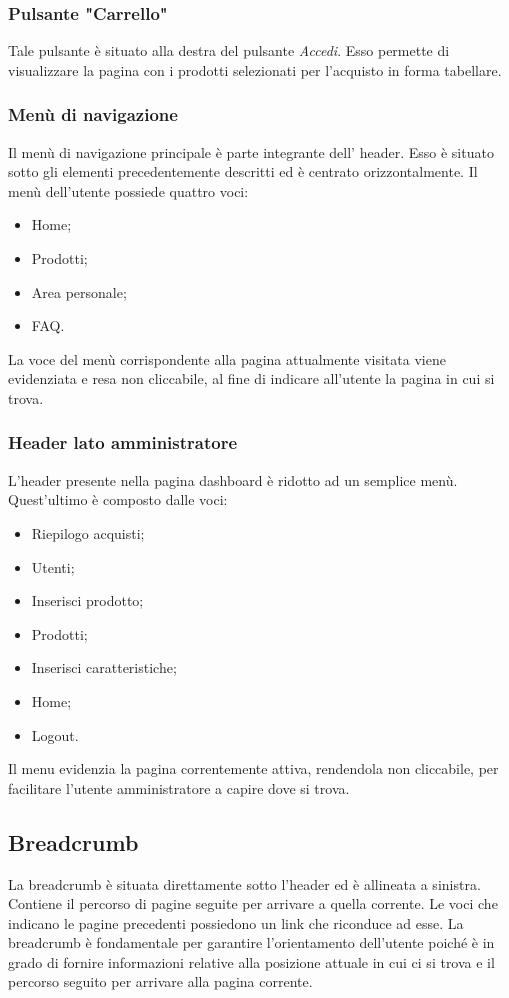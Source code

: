 \subsubsection{Pulsante "Carrello"}
Tale pulsante è situato alla destra del pulsante \textit{Accedi}. Esso permette di visualizzare la pagina con i prodotti selezionati per l'acquisto in forma tabellare.

\subsubsection{Menù di navigazione}
Il menù di navigazione principale è parte integrante dell' header. Esso è situato sotto gli elementi precedentemente descritti ed è centrato orizzontalmente. Il menù dell'utente possiede quattro voci:
\begin{itemize}
    \item Home;
    \item Prodotti;
    \item Area personale;
    \item FAQ.
\end{itemize}
La voce del menù corrispondente alla pagina attualmente visitata viene evidenziata e resa non cliccabile, al fine di indicare all'utente la pagina in cui si trova.

\subsubsection{Header lato amministratore}
L'header presente nella pagina dashboard è ridotto ad un semplice menù. Quest'ultimo è composto dalle voci:
\begin{itemize}
	\item Riepilogo acquisti;
	\item Utenti;
	\item Inserisci prodotto;
	\item Prodotti;
	\item Inserisci caratteristiche;
	\item Home;
	\item Logout.
\end{itemize}
Il menu evidenzia la pagina correntemente attiva, rendendola non cliccabile, per facilitare l'utente amministratore a capire dove si trova.

\subsection{Breadcrumb} 
La breadcrumb è situata direttamente sotto l'header ed è allineata a sinistra. Contiene il percorso di pagine seguite per arrivare a quella corrente. Le voci che indicano le pagine precedenti possiedono un link che riconduce ad esse. La breadcrumb è fondamentale per garantire l'orientamento dell'utente poiché è in grado di fornire informazioni relative alla posizione attuale in cui ci si trova e il percorso seguito per arrivare alla pagina corrente. 

